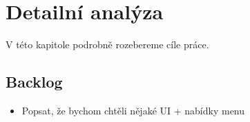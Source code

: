 
\chapter{Detailní analýza}

V této kapitole podrobně rozebereme cíle práce. 



















\section{Backlog}

\begin{itemize}
	
	\item Popsat, že bychom chtěli nějaké UI + nabídky menu

\end{itemize}
